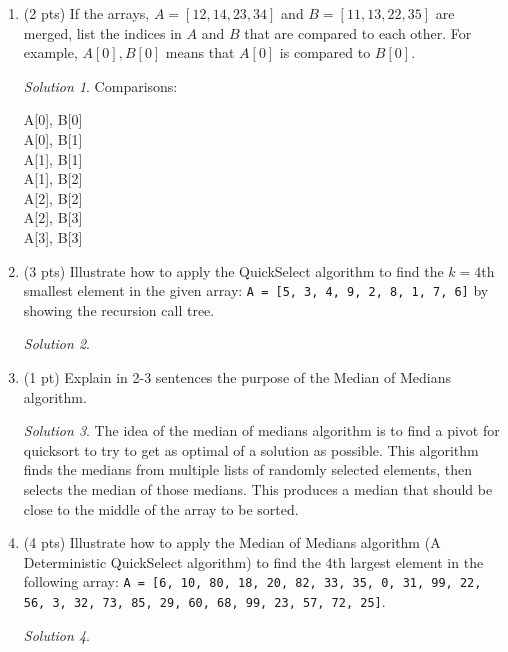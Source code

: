 \documentclass[12pt]{article}
\theoremstyle{remark}
\newtheorem*{solution}{Solution}
\begin{document}
\begin{enumerate}
\item (2 pts) If the arrays, $A=[12, 14, 23, 34]$ and $B=[11, 13, 22, 35]$ are merged, list the indices in $A$ and $B$ that are compared to each other. For example, $A[0], B[0]$ means that $A[0]$ is compared to $B[0]$.
\begin{solution} Comparisons:
\begin{center}
A[0], B[0] \\
A[0], B[1] \\
A[1], B[1] \\
A[1], B[2] \\
A[2], B[2] \\
A[2], B[3] \\
A[3], B[3] \\
\end{center}
\end{solution}

\item (3 pts) Illustrate how to apply the QuickSelect algorithm to find the $k = 4$th smallest element in the given array: \texttt{A = [5, 3, 4, 9, 2, 8, 1, 7, 6]} by showing the recursion call tree.
\begin{solution}

\end{solution}
\pagebreak
\item (1 pt) Explain in 2-3 sentences the purpose of the Median of Medians algorithm.
\begin{solution}
The idea of the median of medians algorithm is to find a pivot for quicksort to try to get as optimal of a solution as possible. This algorithm finds the medians from multiple lists of randomly selected elements, then selects the median of those medians. This produces a median that should be close to the middle of the array to be sorted.
\end{solution}

\item (4 pts) Illustrate how to apply the Median of Medians algorithm (A Deterministic QuickSelect algorithm) to find the $4$th largest element in the following array: \texttt{A = [6, 10, 80, 18, 20, 82, 33, 35, 0, 31, 99, 22, 56, 3, 32, 73, 85, 29, 60, 68, 99, 23, 57, 72, 25]}.
\begin{solution}


\end{solution}
\end{enumerate}
\end{document}
